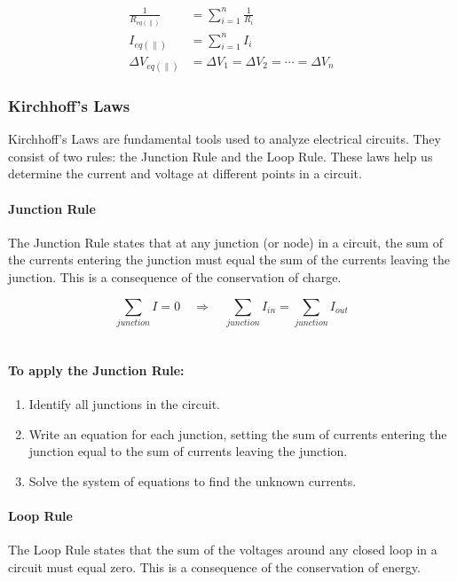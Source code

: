 \begin{align*}
    \frac{1}{R_{eq(\parallel)}} &= \sum_{i=1}^{n} \frac{1}{R_i}\\
    I_{eq(\parallel)} &= \sum_{i=1}^{n} I_i\\
    \Delta V_{eq(\parallel)} &= \Delta V_1 = \Delta V_2 = \cdots = \Delta V_n
\end{align*}

\hrulefill


\subsubsection*{Kirchhoff's Laws}

Kirchhoff's Laws are fundamental tools used to analyze electrical circuits. They consist of two rules: the Junction Rule and the Loop Rule. These laws help us determine the current and voltage at different points in a circuit.

\paragraph*{Junction Rule}
The Junction Rule states that at any junction (or node) in a circuit, the sum of the currents entering the junction must equal the sum of the currents leaving the junction. This is a consequence of the conservation of charge.

\begin{equation*}
    \sum_{junction} I = 0 \quad \Longrightarrow \quad \sum_{junction} I_{in} = \sum_{junction} I_{out}
\end{equation*}\\

\paragraph*{To apply the Junction Rule:}
\begin{enumerate}
    \item Identify all junctions in the circuit.
    \item Write an equation for each junction, setting the sum of currents entering the junction equal to the sum of currents leaving the junction.
    \item Solve the system of equations to find the unknown currents.
\end{enumerate}

\paragraph*{Loop Rule}
The Loop Rule states that the sum of the voltages around any closed loop in a circuit must equal zero. This is a consequence of the conservation of energy.

